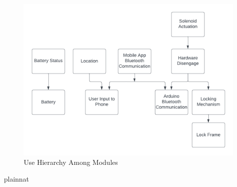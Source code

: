 \documentclass[12pt, titlepage]{article}
\begin{document}
\begin{figure}[H]
\centering
\includegraphics[width=1\textwidth]{DAG.png}
\caption{Use Hierarchy Among Modules}
\label{FigUH}
\end{figure}


 {plainnat}


\newpage{}
\end{document}
